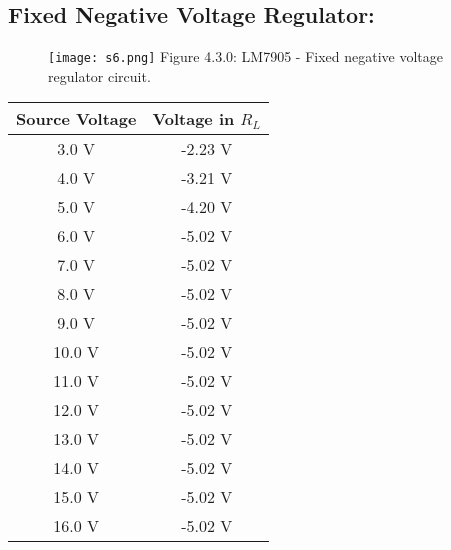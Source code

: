 \subsection{Fixed Negative Voltage Regulator:}

\begin{multicols}{2}
\begin{tasks}
\begin{figure}[H]
\texttt{[image: s6.png]}
\centering \linebreak \linebreak Figure 4.3.0: LM7905 - Fixed negative voltage regulator circuit.
\end{figure}
\begin{center}
\begin{tabular}[.5cm]{ c c }
\toprule
Source Voltage & Voltage in $R_{L}$ \\
\midrule
3.0 V & -2.23 V \\
\cmidrule{1-2}
4.0 V & -3.21 V \\
\cmidrule{1-2}
5.0 V & -4.20 V \\
\cmidrule{1-2}
6.0 V & -5.02 V \\
\cmidrule{1-2}
7.0 V & -5.02 V \\
\cmidrule{1-2}
8.0 V & -5.02 V \\
\cmidrule{1-2}
9.0 V & -5.02 V \\
\cmidrule{1-2}
10.0 V & -5.02 V \\
\cmidrule{1-2}
11.0 V & -5.02 V \\
\cmidrule{1-2}
12.0 V & -5.02 V \\
\cmidrule{1-2}
13.0 V & -5.02 V \\
\cmidrule{1-2}
14.0 V & -5.02 V \\
\cmidrule{1-2}
15.0 V & -5.02 V \\
\cmidrule{1-2}
16.0 V & -5.02 V \\
\bottomrule
\end{tabular}
\end{center} 


\end{tasks}
\end{multicols}
